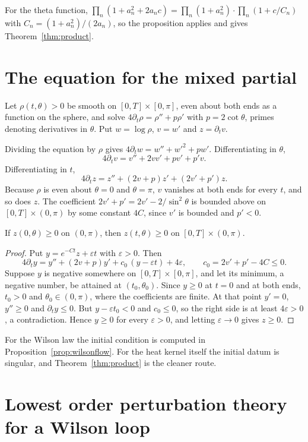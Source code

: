 For the theta function, $\prod_n(1+a_n^2+2a_nc)=\prod_n(1+a_n^2)\cdot\prod_n(1+c/C_n)$ with $C_n=(1+a_n^2)/(2a_n)$, so the proposition applies and gives Theorem~\ref{thm:product}.

\section{The equation for the mixed partial}\label{ch:proofs2}

Let $\rho(t,\theta)>0$ be smooth on $[0,T]\times[0,\pi]$, even about both ends as a function on the sphere, and solve $4\partial_t\rho=\rho''+p\rho'$ with $p=2\cot\theta$, primes denoting derivatives in $\theta$. Put $w=\log\rho$, $v=w'$ and $z=\partial_tv$.

Dividing the equation by $\rho$ gives $4\partial_tw=w''+w'^2+pw'$. Differentiating in $\theta$,
\[
4\partial_tv=v''+2vv'+pv'+p'v .
\]
Differentiating in $t$,
\[
4\partial_tz=z''+(2v+p)z'+(2v'+p')z .
\]
Because $\rho$ is even about $\theta=0$ and $\theta=\pi$, $v$ vanishes at both ends for every $t$, and so does $z$. The coefficient $2v'+p'=2v'-2/\sin^2\theta$ is bounded above on $[0,T]\times(0,\pi)$ by some constant $4C$, since $v'$ is bounded and $p'<0$.

\begin{proposition}
If $z(0,\theta)\ge0$ on $(0,\pi)$, then $z(t,\theta)\ge0$ on $[0,T]\times(0,\pi)$.
\end{proposition}

\begin{proof}
Put $y=e^{-Ct}z+\varepsilon t$ with $\varepsilon>0$. Then
\[
4\partial_ty=y''+(2v+p)y'+c_0\,(y-\varepsilon t)+4\varepsilon,\qquad c_0=2v'+p'-4C\le0 .
\]
Suppose $y$ is negative somewhere on $[0,T]\times[0,\pi]$, and let its minimum, a negative number, be attained at $(t_0,\theta_0)$. Since $y\ge0$ at $t=0$ and at both ends, $t_0>0$ and $\theta_0\in(0,\pi)$, where the coefficients are finite. At that point $y'=0$, $y''\ge0$ and $\partial_ty\le0$. But $y-\varepsilon t_0<0$ and $c_0\le0$, so the right side is at least $4\varepsilon>0$, a contradiction. Hence $y\ge0$ for every $\varepsilon>0$, and letting $\varepsilon\to0$ gives $z\ge0$.
\end{proof}

For the Wilson law the initial condition is computed in Proposition~\ref{prop:wilsonflow}. For the heat kernel itself the initial datum is singular, and Theorem~\ref{thm:product} is the cleaner route.

\section{Lowest order perturbation theory for a Wilson loop}


